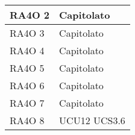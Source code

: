 \begin{center}
\begin{longtable}{ | p{5cm} | p{5cm} |}
        RA4O 2 &  Capitolato \newline  \\ \hline      
        RA4O 3 &  Capitolato \newline  \\ \hline      
        RA4O 4 &  Capitolato \newline  \\ \hline      
        RA4O 5 &  Capitolato \newline  \\ \hline      
        RA4O 6 &  Capitolato \newline  \\ \hline      
        RA4O 7 &  Capitolato \newline  \\ \hline      
        RA4O 8 &  UCU12 \newline  UCS3.6 \newline  \\ \hline     
      \end{longtable}
      \egroup
      \end{center}  
\clearpage


